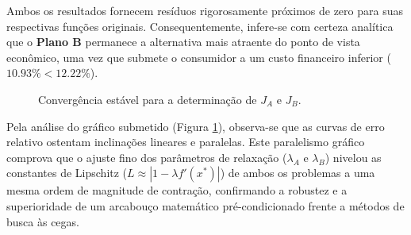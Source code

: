Ambos os resultados fornecem resíduos rigorosamente próximos de zero para suas respectivas funções originais. Consequentemente, infere-se com certeza analítica que o \textbf{Plano B} permanece a alternativa mais atraente do ponto de vista econômico, uma vez que submete o consumidor a um custo financeiro inferior ($10.93\% < 12.22\%$).

\begin{figure}[H]
    \centering
    \caption{Convergência estável para a determinação de $J_A$ e $J_B$.}
    \label{fig:convergencia_ponto_fixo_juros}
\end{figure}

Pela análise do gráfico submetido (Figura \ref{fig:convergencia_ponto_fixo_juros}), observa-se que as curvas de erro relativo ostentam inclinações lineares e paralelas. Este paralelismo gráfico comprova que o ajuste fino dos parâmetros de relaxação ($\lambda_A$ e $\lambda_B$) nivelou as constantes de Lipschitz ($L \approx |1 - \lambda f'(x^*)|$) de ambos os problemas a uma mesma ordem de magnitude de contração, confirmando a robustez e a superioridade de um arcabouço matemático pré-condicionado frente a métodos de busca às cegas.


